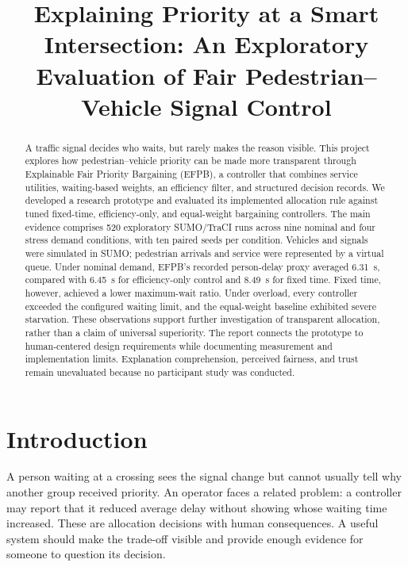 \documentclass[sigconf]{acmart}
\title[Explainable Priority at a Smart Intersection]{Explaining Priority at a Smart Intersection: An Exploratory Evaluation of Fair Pedestrian--Vehicle Signal Control}
\begin{document}
\begin{abstract}
A traffic signal decides who waits, but rarely makes the reason visible.
This project explores how pedestrian--vehicle priority can be made more
transparent through Explainable Fair Priority Bargaining (EFPB), a
controller that combines service utilities, waiting-based weights, an
efficiency filter, and structured decision records. We developed a
research prototype and evaluated its implemented allocation rule against
tuned fixed-time, efficiency-only, and equal-weight bargaining controllers.
The main evidence comprises 520 exploratory SUMO/TraCI runs across nine
nominal and four stress demand conditions, with ten paired seeds per
condition. Vehicles and signals were simulated in SUMO; pedestrian
arrivals and service were represented by a virtual queue. Under nominal
demand, EFPB's recorded person-delay proxy averaged 6.31~s, compared with
6.45~s for efficiency-only control and 8.49~s for fixed time. Fixed time,
however, achieved a lower maximum-wait ratio. Under overload, every
controller exceeded the configured waiting limit, and the equal-weight
baseline exhibited severe starvation. These observations support further
investigation of transparent allocation, rather than a claim of universal
superiority. The report connects the prototype to human-centered design
requirements while documenting measurement and implementation limits.
Explanation comprehension, perceived fairness, and trust remain
unevaluated because no participant study was conducted.
\end{abstract}
\maketitle
\pagestyle{plain}
\thispagestyle{plain}
\raggedbottom

\section{Introduction}
A person waiting at a crossing sees the signal change but cannot usually
tell why another group received priority. An operator faces a related
problem: a controller may report that it reduced average delay without
showing whose waiting time increased. These are allocation decisions with
human consequences. A useful system should make the trade-off visible
and provide enough evidence for someone to question its decision.
\end{document}
